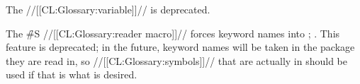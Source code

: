 
The //[[CL:Glossary:variable]]//  is deprecated.


\endsubsection%


The \f{\#S} //[[CL:Glossary:reader macro]]// forces keyword names into ;
\seesection\SharpsignS.
This feature is deprecated;
in the future, keyword names will be taken in the package they are read in,
so //[[CL:Glossary:symbols]]// that are actually in 
should be used if that is what is desired.


\endsubsection%

